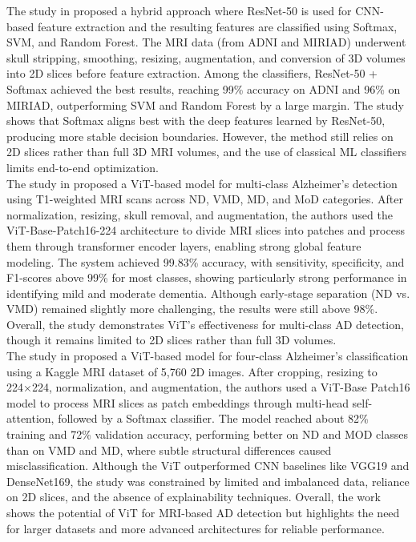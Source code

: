 The study in \cite{alsaeed2022brain} proposed a hybrid approach where ResNet-50 is used for CNN-based feature extraction and the resulting features are classified using Softmax, SVM, and Random Forest. The MRI data (from ADNI and MIRIAD) underwent skull stripping, smoothing, resizing, augmentation, and conversion of 3D volumes into 2D slices before feature extraction. Among the classifiers, ResNet-50 + Softmax achieved the best results, reaching 99\% accuracy on ADNI and 96\% on MIRIAD, outperforming SVM and Random Forest by a large margin. The study shows that Softmax aligns best with the deep features learned by ResNet-50, producing more stable decision boundaries. However, the method still relies on 2D slices rather than full 3D MRI volumes, and the use of classical ML classifiers limits end-to-end optimization.\\

The study in \cite{alshayeji2024alzheimer} proposed a ViT-based model for multi-class Alzheimer’s detection using T1-weighted MRI scans across ND, VMD, MD, and MoD categories. After normalization, resizing, skull removal, and augmentation, the authors used the ViT-Base-Patch16-224 architecture to divide MRI slices into patches and process them through transformer encoder layers, enabling strong global feature modeling. The system achieved 99.83\% accuracy, with sensitivity, specificity, and F1-scores above 99\% for most classes, showing particularly strong performance in identifying mild and moderate dementia. Although early-stage separation (ND vs. VMD) remained slightly more challenging, the results were still above 98\%. Overall, the study demonstrates ViT’s effectiveness for multi-class AD detection, though it remains limited to 2D slices rather than full 3D volumes.\\

The study in \cite{pandey2025leveraging} proposed a ViT-based model for four-class Alzheimer’s classification using a Kaggle MRI dataset of 5{,}760 2D images. After cropping, resizing to 224×224, normalization, and augmentation, the authors used a ViT-Base Patch16 model to process MRI slices as patch embeddings through multi-head self-attention, followed by a Softmax classifier. The model reached about 82\% training and 72\% validation accuracy, performing better on ND and MOD classes than on VMD and MD, where subtle structural differences caused misclassification. Although the ViT outperformed CNN baselines like VGG19 and DenseNet169, the study was constrained by limited and imbalanced data, reliance on 2D slices, and the absence of explainability techniques. Overall, the work shows the potential of ViT for MRI-based AD detection but highlights the need for larger datasets and more advanced architectures for reliable performance.\\

